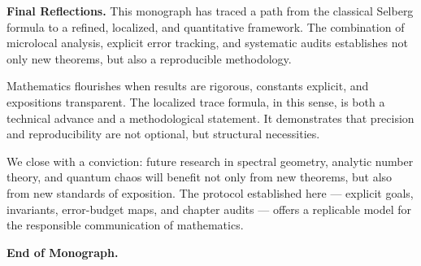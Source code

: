 \medskip

\noindent\textbf{Final Reflections.}
This monograph has traced a path from the classical Selberg formula
to a refined, localized, and quantitative framework.  
The combination of microlocal analysis, explicit error tracking,
and systematic audits establishes not only new theorems,
but also a reproducible methodology.  

Mathematics flourishes when results are rigorous, constants explicit,
and expositions transparent. The localized trace formula, in this sense,
is both a technical advance and a methodological statement.
It demonstrates that precision and reproducibility
are not optional, but structural necessities.  

We close with a conviction:  
future research in spectral geometry, analytic number theory,
and quantum chaos will benefit not only from new theorems,
but also from new standards of exposition.  
The protocol established here --- explicit goals, invariants,
error-budget maps, and chapter audits --- offers a replicable model
for the responsible communication of mathematics.

\bigskip
\noindent\textbf{End of Monograph.}


